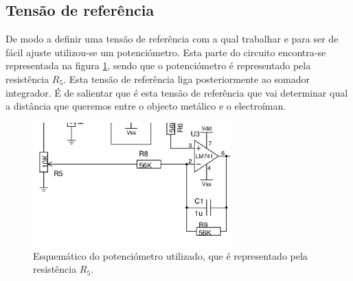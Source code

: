\documentclass[%
  reprint,
  nofootinbib,
  amsmath,amssymb,
  aps,
  10pt,
  a4paper
]{revtex4-1}
\begin{document}
\subsection{Tensão de referência}
De modo a definir uma tensão de referência com a qual trabalhar e para ser de fácil ajuste utilizou-se um potenciómetro. Esta parte do circuito encontra-se representada na figura \ref{fig:tensaoreferencia}, sendo que o potenciómetro é representado pela resistência $R_5$. Esta tensão de referência liga posteriormente ao somador integrador. É de salientar que é esta tensão de referência que vai determinar qual a distância que queremos entre o objecto metálico e o electroíman.

\begin{figure}[h]
\includegraphics[width=3in]{../img/ref.png}
\caption{Esquemático do potenciómetro utilizado, que é representado pela resistência $R_5$.}
\label{fig:tensaoreferencia}
\end{figure}
\end{document}
